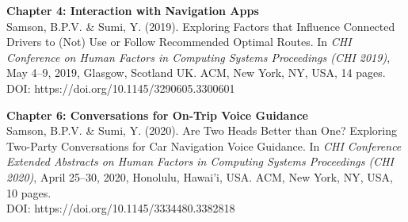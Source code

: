 \large \textbf{Chapter 4: Interaction with Navigation Apps} \normalsize \\
\vspace*{5pt}
\noindent [1] Samson, B.P.V. \& Sumi, Y. (2019). Exploring Factors that Influence Connected Drivers to (Not) Use or Follow Recommended Optimal Routes. In \textit{CHI Conference on Human Factors in Computing Systems Proceedings (CHI 2019)}, May 4–9, 2019, Glasgow, Scotland UK. ACM, New York, NY, USA, 14 pages. \\ 
\noindent DOI: https://doi.org/10.1145/3290605.3300601

\vspace*{15pt}

\noindent \large \textbf{Chapter 6: Conversations for On-Trip Voice Guidance} \normalsize \\
\vspace*{5pt}
\noindent [2] Samson, B.P.V. \& Sumi, Y. (2020). Are Two Heads Better than One? Exploring Two-Party Conversations for Car Navigation Voice Guidance. In \textit{CHI Conference Extended Abstracts on Human Factors in Computing Systems Proceedings (CHI 2020)}, April 25–30, 2020, Honolulu, Hawai'i, USA. ACM, New York, NY, USA, 10 pages. \\ 
\noindent DOI: https://doi.org/10.1145/3334480.3382818